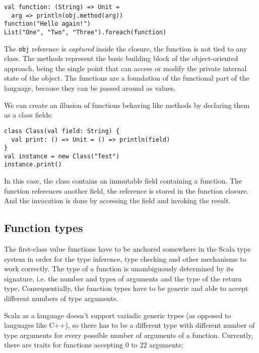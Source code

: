\lstset{style=Scala}
\begin{lstlisting}
val function: (String) => Unit = 
  arg => println(obj.method(arg))
function("Hello again!")
List("One", "Two", "Three").foreach(function)
\end{lstlisting}

The \lstinline|obj| reference is \textit{captured} inside the closure, the function is not tied to any class. The methods represent the basic building block of the object-oriented approach, being the single point that can access or modify the private internal state of the object. The functions are a foundation of the functional part of the language, because they can be passed around as values.

We can create an illusion of functions behaving like methods by declaring them as a class fields:

\lstset{style=Scala}
\begin{lstlisting}
class Class(val field: String) {
  val print: () => Unit = () => println(field)
}
val instance = new Class("Test")
instance.print()
\end{lstlisting}

In this case, the class contains an immutable field  containing a function. The function references another field, the reference is stored in the function closure. And the invocation is done by accessing the  field and invoking the result.


\subsection{Function types}
\label{subsec:functiontypes}

The first-class value functions have to be anchored somewhere in the Scala type system in order for the type inference, type checking and other mechanisms to work correctly. The type of a function is unambiguously determined by its signature, i.e. the number and types of arguments and the type of the return type. Consequentially, the function types have to be generic and able to accept different numbers of type arguments.

Scala as a language doesn't support variadic generic types (as opposed to languages like C++), so there has to be a different type with different number of type arguments for every possible number of arguments of a function. Currently, there are traits for functions accepting 0 to 22 arguments:

